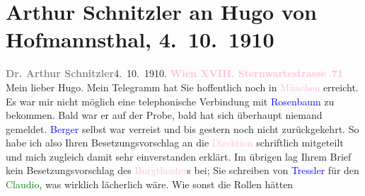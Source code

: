 

               \section[Arthur Schnitzler an Hugo von Hofmannsthal, 4. 10. 1910]{ Arthur Schnitzler an Hugo von Hofmannsthal, 4. 10. 1910}\nopagebreak{}\rehead{ }\normalsize\beginnumbering{} \toendnotes[C]{\smallbreak\pagebreak[2]} 
\toendnotes[C]{\smallbreak}\pstart
           {\pb}\textcolor{gray}{\textbf{Dr. Arthur Schnitzler}}\hfill 4. 10. 1910.\pend
           \pstart
           \textcolor{gray}{\textbf{\textcolor{pink}{Wien XVIII. Sternwartestrasse 71}{}\ledrightnote{\textcolor{pink}{Sternwartestraße}}}}\pend
           \pstart\center{}Mein lieber Hugo.\pend\pstart
           Mein Telegramm hat Sie hoffentlich noch in \textcolor{pink}{München}{}\ledrightnote{\textcolor{pink}{München}} erreicht. Es war mir nicht möglich eine telephonische
                    Verbindung mit \textcolor{blue}{Rosenbaum}{}\ledrightnote{\textcolor{blue}{Richard Rosenbaum}} zu bekommen. Bald
                    war er auf der Probe, bald hat sich überhaupt niemand gemeldet. \textcolor{blue}{Berger}{}\ledrightnote{\textcolor{blue}{Alfred von Berger}} selbst war verreist und bis gestern noch nicht
                    zurückgekehrt. So habe ich also Ihren Besetzungsvorschlag an die \textcolor{pink}{Direktion}{} schriftlich
                    mitgeteilt und mich zugleich damit sehr einverstanden erklärt. Im übrigen lag
                    Ihrem Brief kein Besetzungsvorschlag des \textcolor{pink}{Burgtheater}{}\ledrightnote{\textcolor{pink}{Burgtheater}}s bei; Sie schreiben von \textcolor{blue}{Tressler}{}\ledrightnote{\textcolor{blue}{Otto Tressler}} für den \textcolor{green}{Claudio}{}, was wirklich lächerlich wäre. Wie sonst die Rollen hätten
